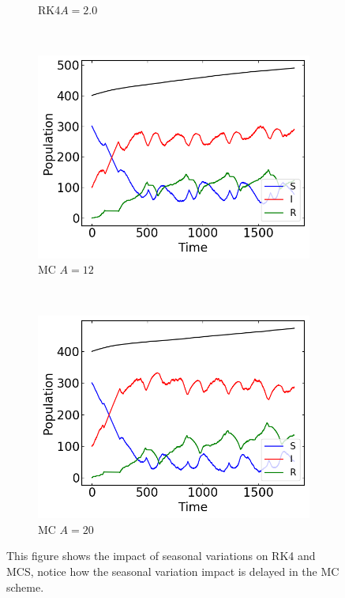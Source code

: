 \begin{figure}[H]
\begin{subfigure}{0.49\textwidth}
         \caption{RK4$A=2.0$}
    \end{subfigure}
     ~ 
    \begin{subfigure}{0.49\textwidth}
         \centering
         \includegraphics[width=\linewidth]{../fig/texfig/MCSV_A=12T=5.png}
         \caption{MC $A=12$ }
    \end{subfigure}
     ~ 
    \begin{subfigure}{0.49\textwidth}
         \centering
         \includegraphics[width=\linewidth]{../fig/texfig/MCSV_A=20T=5.png}
         \caption{MC $A = 20$ }
    \end{subfigure}
    \caption{This figure shows the impact of seasonal variations on RK4 and MCS, notice how the seasonal variation impact is delayed in the MC scheme.}
    \label{fig:RK4VD3}
\end{figure}




